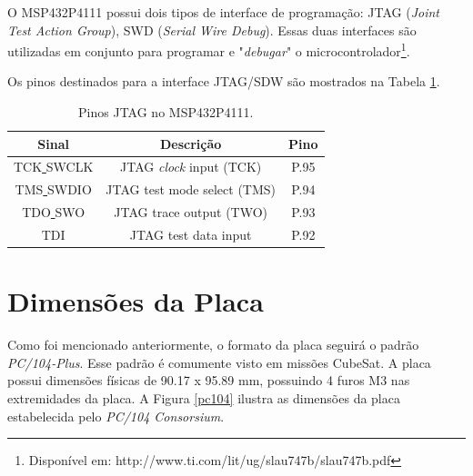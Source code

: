 O MSP432P4111 possui dois tipos de interface de programação: JTAG (\textit{Joint Test Action Group}), SWD (\textit{Serial Wire Debug}). Essas duas interfaces são utilizadas em conjunto para programar e "\textit{debugar}" o microcontrolador\footnote{Disponível em: http://www.ti.com/lit/ug/slau747b/slau747b.pdf}. 

Os pinos destinados para a interface JTAG/SDW são mostrados na Tabela \ref{jtagPin}.

\begin{table}[h]
	\centering
	\caption{Pinos JTAG no MSP432P4111.}
	\label{jtagPin}
	\begin{tabular}{@{}ccc@{}}
		\toprule
		Sinal   & Descrição & Pino 
		\\ \midrule
		TCK\underline{ }SWCLK & JTAG \textit{clock} input (TCK) & P.95
		\\ \midrule
		TMS\underline{ }SWDIO & JTAG test mode select (TMS) & P.94
		\\ \midrule
		TDO\underline{ }SWO & JTAG trace output (TWO) & P.93
		\\ \midrule
		TDI & JTAG test data input & P.92        
		\\ \bottomrule
	\end{tabular}
\end{table}




\section{Dimensões da Placa}

Como foi mencionado anteriormente, o formato da placa seguirá o padrão \textit{PC/104-Plus}. Esse padrão é comumente visto em missões CubeSat. A placa possui dimensões físicas de 90.17 x 95.89 mm, possuindo 4 furos M3 nas extremidades da placa. A Figura \ref{pc104} ilustra as dimensões da placa estabelecida pelo \textit{PC/104 Consorsium}.

